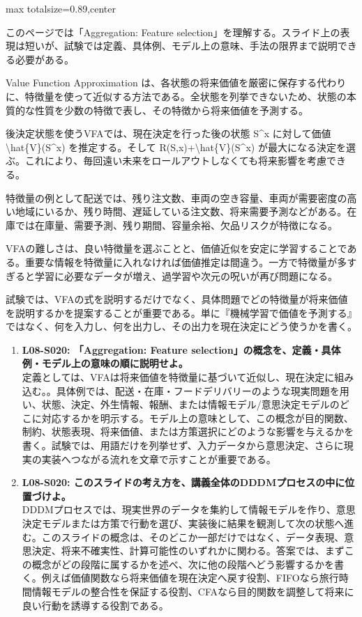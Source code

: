 \begin{minipage}[t]{0.58\textwidth}
\begin{adjustbox}{max totalsize={\textwidth}{0.89\textheight},center}
\begin{minipage}{\textwidth}\scriptsize
{}このページでは「Aggregation: Feature selection」を理解する。スライド上の表現は短いが、試験では定義、具体例、モデル上の意味、手法の限界まで説明できる必要がある。\par
Value Function Approximation は、各状態の将来価値を厳密に保存する代わりに、特徴量を使って近似する方法である。全状態を列挙できないため、状態の本質的な性質を少数の特徴で表し、その特徴から将来価値を予測する。\par
後決定状態を使うVFAでは、現在決定を行った後の状態 S\textasciicircum{}x に対して価値 \textbackslash{}hat\{V\}(S\textasciicircum{}x) を推定する。そして R(S,x)+\textbackslash{}hat\{V\}(S\textasciicircum{}x) が最大になる決定を選ぶ。これにより、毎回遠い未来をロールアウトしなくても将来影響を考慮できる。\par
特徴量の例として配送では、残り注文数、車両の空き容量、車両が需要密度の高い地域にいるか、残り時間、遅延している注文数、将来需要予測などがある。在庫では在庫量、需要予測、残り期間、容量余裕、欠品リスクが特徴になる。\par
VFAの難しさは、良い特徴量を選ぶことと、価値近似を安定に学習することである。重要な情報を特徴量に入れなければ価値推定は間違う。一方で特徴量が多すぎると学習に必要なデータが増え、過学習や次元の呪いが再び問題になる。\par
試験では、VFAの式を説明するだけでなく、具体問題でどの特徴量が将来価値を説明するかを提案することが重要である。単に『機械学習で価値を予測する』ではなく、何を入力し、何を出力し、その出力を現在決定にどう使うかを書く。\par{}\begin{enumerate}\item \textbf{L08-S020: 「Aggregation: Feature selection」の概念を、定義・具体例・モデル上の意味の順に説明せよ。}\\定義としては、VFAは将来価値を特徴量に基づいて近似し、現在決定に組み込む。。具体例では、配送・在庫・フードデリバリーのような現実問題を用い、状態、決定、外生情報、報酬、または情報モデル/意思決定モデルのどこに対応するかを明示する。モデル上の意味として、この概念が目的関数、制約、状態表現、将来価値、または方策選択にどのような影響を与えるかを書く。試験では、用語だけを列挙せず、入力データから意思決定、さらに現実の実装へつながる流れを文章で示すことが重要である。\item \textbf{L08-S020: このスライドの考え方を、講義全体のDDDMプロセスの中に位置づけよ。}\\DDDMプロセスでは、現実世界のデータを集約して情報モデルを作り、意思決定モデルまたは方策で行動を選び、実装後に結果を観測して次の状態へ進む。このスライドの概念は、そのどこか一部だけではなく、データ表現、意思決定、将来不確実性、計算可能性のいずれかに関わる。答案では、まずこの概念がどの段階に属するかを述べ、次に他の段階へどう影響するかを書く。例えば価値関数なら将来価値を現在決定へ戻す役割、FIFOなら旅行時間情報モデルの整合性を保証する役割、CFAなら目的関数を調整して将来に良い行動を誘導する役割である。\end{enumerate}

\end{minipage}
\end{adjustbox}
\end{minipage}
